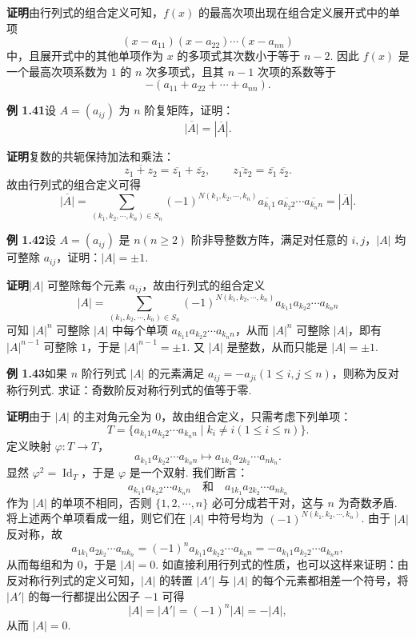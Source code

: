 \documentclass[UTF8,12pt,a4paper,fontset=fandol]{ctexart}
\begin{document}
\noindent\textbf{证明}\quad 由行列式的组合定义可知，$f(x)$ 的最高次项出现在组合定义展开式中的单项
\[
(x-a_{11})(x-a_{22})\cdots(x-a_{nn})
\]
中，且展开式中的其他单项作为 $x$ 的多项式其次数小于等于 $n-2$. 因此 $f(x)$ 是一个最高次项系数为 $1$ 的 $n$ 次多项式，且其 $n-1$ 次项的系数等于
\[
-(a_{11}+a_{22}+\cdots+a_{nn}).
\]

\noindent\textbf{例 1.41}\quad 设 $A=(a_{ij})$ 为 $n$ 阶复矩阵，证明：
\[
\overline{|A|}=|\overline{A}|.
\]

\noindent\textbf{证明}\quad 复数的共轭保持加法和乘法：
\[
\overline{z_1+z_2}=\overline{z_1}+\overline{z_2},\qquad
\overline{z_1z_2}=\overline{z_1}\,\overline{z_2}.
\]
故由行列式的组合定义可得
\[
\overline{|A|}
=\sum_{(k_1,k_2,\cdots,k_n)\in S_n}
(-1)^{N(k_1,k_2,\cdots,k_n)}
\overline{a_{k_1 1}}\,\overline{a_{k_2 2}}\cdots\overline{a_{k_n n}}
=|\overline{A}|.
\]

\noindent\textbf{例 1.42}\quad 设 $A=(a_{ij})$ 是 $n(n\ge2)$ 阶非导整数方阵，满足对任意的 $i,j$，$|A|$ 均可整除 $a_{ij}$，证明：$|A|=\pm1$.

\noindent\textbf{证明}\quad $|A|$ 可整除每个元素 $a_{ij}$，故由行列式的组合定义
\[
|A|=\sum_{(k_1,k_2,\cdots,k_n)\in S_n}
(-1)^{N(k_1,k_2,\cdots,k_n)}a_{k_1 1}a_{k_2 2}\cdots a_{k_n n}
\]
可知 $|A|^n$ 可整除 $|A|$ 中每个单项 $a_{k_1 1}a_{k_2 2}\cdots a_{k_n n}$，从而 $|A|^n$ 可整除 $|A|$，即有 $|A|^{n-1}$ 可整除 $1$，于是 $|A|^{n-1}=\pm1$. 又 $|A|$ 是整数，从而只能是 $|A|=\pm1$.

\noindent\textbf{例 1.43}\quad 如果 $n$ 阶行列式 $|A|$ 的元素满足 $a_{ij}=-a_{ji}(1\le i,j\le n)$，则称为反对称行列式. 求证：奇数阶反对称行列式的值等于零.

\noindent\textbf{证明}\quad 由于 $|A|$ 的主对角元全为 $0$，故由组合定义，只需考虑下列单项：
\[
T=\{a_{k_1 1}a_{k_2 2}\cdots a_{k_n n}\mid k_i\ne i(1\le i\le n)\}.
\]
定义映射 $\varphi:T\to T$，
\[
a_{k_1 1}a_{k_2 2}\cdots a_{k_n n}\mapsto a_{1k_1}a_{2k_2}\cdots a_{nk_n}.
\]
显然 $\varphi^2=\operatorname{Id}_T$，于是 $\varphi$ 是一个双射. 我们断言：
\[
a_{k_1 1}a_{k_2 2}\cdots a_{k_n n}
\quad\text{和}\quad
a_{1k_1}a_{2k_2}\cdots a_{nk_n}
\]
作为 $|A|$ 的单项不相同，否则 $\{1,2,\cdots,n\}$ 必可分成若干对，这与 $n$ 为奇数矛盾. 将上述两个单项看成一组，则它们在 $|A|$ 中符号均为 $(-1)^{N(k_1,k_2,\cdots,k_n)}$. 由于 $|A|$ 反对称，故
\[
a_{1k_1}a_{2k_2}\cdots a_{nk_n}=(-1)^n a_{k_1 1}a_{k_2 2}\cdots a_{k_n n}
=-a_{k_1 1}a_{k_2 2}\cdots a_{k_n n},
\]
从而每组和为 $0$，于是 $|A|=0$. 如直接利用行列式的性质，也可以这样来证明：由反对称行列式的定义可知，$|A|$ 的转置 $|A'|$ 与 $|A|$ 的每个元素都相差一个符号，将 $|A'|$ 的每一行都提出公因子 $-1$ 可得
\[
|A|=|A'|=(-1)^n|A|=-|A|,
\]
从而 $|A|=0$.
\end{document}
